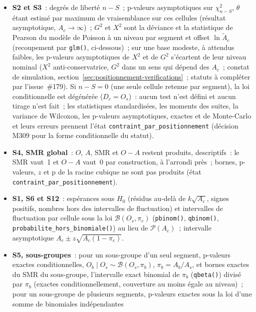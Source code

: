 \documentclass[a4paper,11pt]{article}
\newcommand{\code}[1]{\texttt{\small #1}}
\begin{document}
\begin{itemize}[leftmargin=*, itemsep=2pt]
  \item \textbf{S2 et S3}~: degrés de liberté $n - S$~; p-valeurs
    asymptotiques sur $\chi^2_{n-S}$, $\theta$ étant estimé par maximum de
    vraisemblance sur ces cellules (résultat asymptotique, $A_c \to
    \infty$)~; $G^2$ et $X^2$ sont la déviance et la statistique de Pearson
    du modèle de Poisson à un niveau par segment et offset $\ln \tilde A_c$
    (recoupement par \code{glm()}, ci-dessous)~; sur une base modeste, à
    attendus faibles, les p-valeurs asymptotiques de $X^2$ et de $G^2$
    s'écartent de leur niveau nominal ($X^2$ anti-conservatrice, $G^2$
    dans un sens qui dépend des $A_c$~; constat de
    simulation, section~\ref{sec:positionnement-verifications}~; statuts à
    compléter par l'issue~\#179). Si $n - S = 0$ (une seule
    cellule retenue par segment), la loi conditionnelle est dégénérée
    ($D_c = O_s$)~: aucun test n'est défini et aucun tirage n'est fait~;
    les statistiques standardisées, les moments des suites, la variance de
    Wilcoxon, les p-valeurs asymptotiques, exactes et de Monte-Carlo et
    leurs erreurs prennent l'état \code{contraint\_par\_positionnement}
    (décision M309 pour la forme conditionnelle du statut).
  \item \textbf{S4, SMR global}~: $O$, $A$, SMR et $O - A$ restent
    produits, descriptifs~: le SMR vaut~1 et $O - A$ vaut~0 par
    construction, à l'arrondi près~; bornes, p-valeurs, $z$ et p de la
    racine cubique ne sont pas produits (état
    \code{contraint\_par\_positionnement}).
  \item \textbf{S1, S6 et S12}~: espérances sous $H_0$ (résidus au-delà de
    $k\sqrt{A_c}$, signes positifs, nombres hors des intervalles de
    fluctuation) et intervalles de fluctuation par cellule sous la loi
    $\mathcal{B}(O_s, \pi_c)$ (\code{pbinom()}, \code{qbinom()},
    \code{probabilite\_hors\_binomiale()}) au lieu de $\mathcal{P}(A_c)$~;
    intervalle asymptotique $A_c \pm z\sqrt{A_c(1 - \pi_c)}$.
  \item \textbf{S5, sous-groupes}~: pour un sous-groupe d'un seul segment,
    p-valeurs exactes conditionnelles, $O_b \mid O_s \sim \mathcal{B}(O_s,
    \pi_b)$, $\pi_b = A_b / A_s$, et bornes exactes du SMR du sous-groupe,
    l'intervalle exact binomial de $\pi_b$ (\code{qbeta()}) divisé par
    $\pi_b$ (exactes conditionnellement, couverture au moins égale au
    niveau)~; pour un sous-groupe de plusieurs segments, p-valeurs exactes
    sous la loi d'une somme de binomiales indépendantes

\end{itemize}
\end{document}
